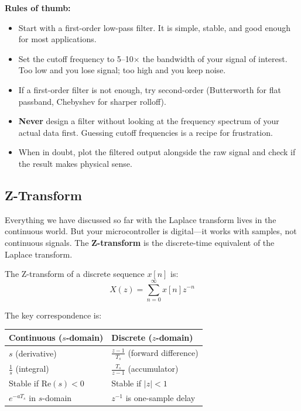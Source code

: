 \textbf{Rules of thumb:}
\begin{itemize}
    \item Start with a first-order low-pass filter. It is simple, stable, and good enough for most applications.
    \item Set the cutoff frequency to 5--10$\times$ the bandwidth of your signal of interest. Too low and you lose signal; too high and you keep noise.
    \item If a first-order filter is not enough, try second-order (Butterworth for flat passband, Chebyshev for sharper rolloff).
    \item \textbf{Never} design a filter without looking at the frequency spectrum of your actual data first. Guessing cutoff frequencies is a recipe for frustration.
    \item When in doubt, plot the filtered output alongside the raw signal and check if the result makes physical sense.
\end{itemize}

\subsection{Z-Transform}

Everything we have discussed so far with the Laplace transform lives in the continuous world. But your microcontroller is digital---it works with samples, not continuous signals. The \textbf{Z-transform} is the discrete-time equivalent of the Laplace transform.

The Z-transform of a discrete sequence $x[n]$ is:
\begin{equation}
X(z) = \sum_{n=0}^{\infty} x[n] z^{-n}
\end{equation}

The key correspondence is:
\begin{center}
\begin{tabular}{ll}
\toprule
\textbf{Continuous ($s$-domain)} & \textbf{Discrete ($z$-domain)} \\
\midrule
$s$ (derivative) & $\frac{z-1}{T_s}$ (forward difference) \\
$\frac{1}{s}$ (integral) & $\frac{T_s}{z-1}$ (accumulator) \\
Stable if $\text{Re}(s) < 0$ & Stable if $|z| < 1$ \\
$e^{-aT_s}$ in $s$-domain & $z^{-1}$ is one-sample delay \\
\bottomrule
\end{tabular}
\end{center}

